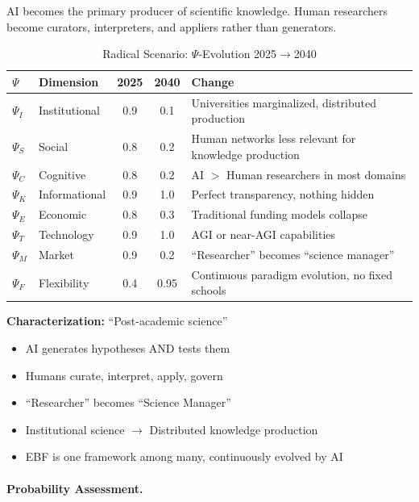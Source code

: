 AI becomes the primary producer of scientific knowledge. Human researchers become
curators, interpreters, and appliers rather than generators.

\begin{table}[htbp]
\centering
\caption{Radical Scenario: $\Psi$-Evolution 2025$\to$2040}
\label{tab:scenario-radical}
\renewcommand{\arraystretch}{1.2}
\small
\begin{tabular}{@{}llccp{5cm}@{}}
\toprule
$\Psi$ & \textbf{Dimension} & \textbf{2025} & \textbf{2040} & \textbf{Change} \\
\midrule
$\Psi_I$ & Institutional & 0.9 & 0.1 & Universities marginalized, distributed production \\
$\Psi_S$ & Social & 0.8 & 0.2 & Human networks less relevant for knowledge production \\
$\Psi_C$ & Cognitive & 0.8 & 0.2 & AI $>$ Human researchers in most domains \\
$\Psi_K$ & Informational & 0.9 & 1.0 & Perfect transparency, nothing hidden \\
$\Psi_E$ & Economic & 0.8 & 0.3 & Traditional funding models collapse \\
$\Psi_T$ & Technology & 0.9 & 1.0 & AGI or near-AGI capabilities \\
$\Psi_M$ & Market & 0.9 & 0.2 & ``Researcher'' becomes ``science manager'' \\
$\Psi_F$ & Flexibility & 0.4 & 0.95 & Continuous paradigm evolution, no fixed schools \\
\bottomrule
\end{tabular}
\end{table}

\textbf{Characterization:} ``Post-academic science''
\begin{itemize}[nosep]
    \item AI generates hypotheses AND tests them
    \item Humans curate, interpret, apply, govern
    \item ``Researcher'' becomes ``Science Manager''
    \item Institutional science $\to$ Distributed knowledge production
    \item EBF is one framework among many, continuously evolved by AI
\end{itemize}

\paragraph{Probability Assessment.}

